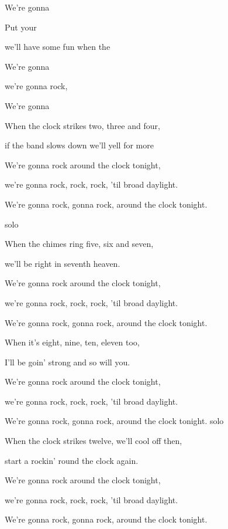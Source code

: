 

\zs 
{}



We're gonna 
\ks

\zs

Put your 

we'll have some fun when the 

We're gonna 

we're gonna rock, 

We're gonna   
\ks

\zs
When the clock strikes two, three and four,

if the band slows down we'll yell for more

We're gonna rock around the clock tonight,

we're gonna rock, rock, rock, 'til broad daylight.

We're gonna rock, gonna rock, around the clock tonight.
\ks

\zs
solo
\ks

\zs
When the chimes ring five, six and seven,

we'll be right in seventh heaven.

We're gonna rock around the clock tonight,

we're gonna rock, rock, rock, 'til broad daylight.

We're gonna rock, gonna rock, around the clock tonight.
\ks

\zs
When it's eight, nine, ten, eleven too,

I'll be goin' strong and so will you.

We're gonna rock around the clock tonight,

we're gonna rock, rock, rock, 'til broad daylight.

We're gonna rock, gonna rock, around the clock tonight.
\ks
\zs
solo
\ks

\zs
When the clock strikes twelve, we'll cool off then,

start a rockin' round the clock again.

We're gonna rock around the clock tonight,

we're gonna rock, rock, rock, 'til broad daylight.

We're gonna rock, gonna rock, around the clock tonight.
\ks

\kp
